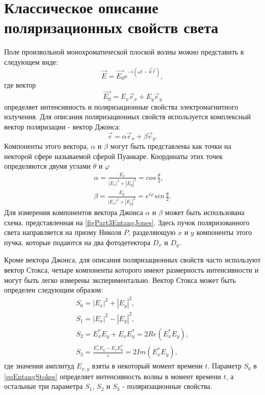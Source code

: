 \section{Классическое описание поляризационных свойств света}
Поле произвольной монохроматической плоской волны можно представить в
следующем виде:
\begin{equation}
\vec{E} = \vec{E_0} e^{-i \left(\omega t - \vec{k}\vec{r}\right)},
\nonumber
\end{equation}
где вектор 
\[
\vec{E_0} = E_{x}\vec{e}_x + E_{y}\vec{e}_y
\]
определяет интенсивность и поляризационные свойства электромагнитного
излучения. Для описания поляризационных свойств используется
комплексный вектор поляризации - вектор Джонса:
\begin{equation}
\vec{e} = \alpha \vec{e}_x + \beta \vec{e}_y.
\label{eqEntangJones}
\end{equation}
Компоненты этого вектора, $\alpha$ и $\beta$ могут быть представлены
как точки на некторой сфере называемой сферой Пуанкаре. Координаты
этих точек определяются двумя углами $\theta$ и $\varphi$
\begin{eqnarray}
\alpha = \frac{E_x}{\left|E_x\right|^2 + \left|E_y\right|^2} = 
 cos \, \frac{\theta}{2},
\nonumber \\
\beta = \frac{E_y}{\left|E_x\right|^2 + \left|E_y\right|^2} = 
 e^{i\varphi} sin \, \frac{\theta}{2}.
\nonumber
\end{eqnarray}
Для измерения компонентов вектора Джонса $\alpha$ и $\beta$ может быть
использована схема, представленная на
\autoref{figPart3EntangJones}. Здесь пучок поляризованного света
направляется на призму Николя $P$, разделяющую $x$ и $y$ компоненты
этого пучка, которые подаются на два фотодетектора $D_x$ и $D_y$.



Кроме вектора Джонса, для описания поляризационных свойств часто
используют вектор Стокса, четыре компоненты которого
имеют размерность интенсивности и могут быть легко измерены
экспериментально. Вектор Стокса может быть определен следующим
образом:
\begin{eqnarray}
S_0 = \left|E_x\right|^2 + \left|E_y\right|^2,
\nonumber \\
S_1 = \left|E_x\right|^2 - \left|E_y\right|^2,
\nonumber \\
S_2 = E_x^{*} E_y + E_x E_y^{*} = 2 Re \left(E_x^{*} E_y\right),
\nonumber \\
S_3 = \frac{E_x^{*} E_y - E_x E_y^{*}}{i} = 2 Im \left(E_x^{*}
E_y\right),
\label{eqEntangStokes}
\end{eqnarray}
где значения амплитуд $E_{x,y}$ взяты в некоторый момент времени $t$. 
Параметр $S_0$ в \eqref{eqEntangStokes} определяет интенсивность волны
в момент времени $t$,
а остальные три параметра $S_1$, $S_2$ и $S_3$ - поляризационные
свойства. 

